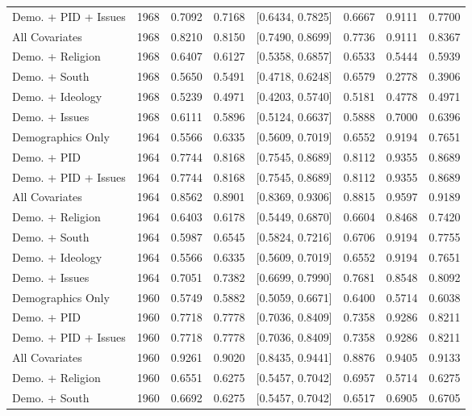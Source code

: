 \begin{longtable}{lrrrlrrr}
  Demo. + PID + Issues & 1968 & 0.7092 & 0.7168 & [0.6434, 0.7825] & 0.6667 & 0.9111 & 0.7700 \\ 
  All Covariates & 1968 & 0.8210 & 0.8150 & [0.7490, 0.8699] & 0.7736 & 0.9111 & 0.8367 \\ 
  Demo. + Religion & 1968 & 0.6407 & 0.6127 & [0.5358, 0.6857] & 0.6533 & 0.5444 & 0.5939 \\ 
  Demo. + South & 1968 & 0.5650 & 0.5491 & [0.4718, 0.6248] & 0.6579 & 0.2778 & 0.3906 \\ 
  Demo. + Ideology & 1968 & 0.5239 & 0.4971 & [0.4203, 0.5740] & 0.5181 & 0.4778 & 0.4971 \\ 
  Demo. + Issues & 1968 & 0.6111 & 0.5896 & [0.5124, 0.6637] & 0.5888 & 0.7000 & 0.6396 \\ 
  Demographics Only & 1964 & 0.5566 & 0.6335 & [0.5609, 0.7019] & 0.6552 & 0.9194 & 0.7651 \\ 
  Demo. + PID & 1964 & 0.7744 & 0.8168 & [0.7545, 0.8689] & 0.8112 & 0.9355 & 0.8689 \\ 
  Demo. + PID + Issues & 1964 & 0.7744 & 0.8168 & [0.7545, 0.8689] & 0.8112 & 0.9355 & 0.8689 \\ 
  All Covariates & 1964 & 0.8562 & 0.8901 & [0.8369, 0.9306] & 0.8815 & 0.9597 & 0.9189 \\ 
  Demo. + Religion & 1964 & 0.6403 & 0.6178 & [0.5449, 0.6870] & 0.6604 & 0.8468 & 0.7420 \\ 
  Demo. + South & 1964 & 0.5987 & 0.6545 & [0.5824, 0.7216] & 0.6706 & 0.9194 & 0.7755 \\ 
  Demo. + Ideology & 1964 & 0.5566 & 0.6335 & [0.5609, 0.7019] & 0.6552 & 0.9194 & 0.7651 \\ 
  Demo. + Issues & 1964 & 0.7051 & 0.7382 & [0.6699, 0.7990] & 0.7681 & 0.8548 & 0.8092 \\ 
  Demographics Only & 1960 & 0.5749 & 0.5882 & [0.5059, 0.6671] & 0.6400 & 0.5714 & 0.6038 \\ 
  Demo. + PID & 1960 & 0.7718 & 0.7778 & [0.7036, 0.8409] & 0.7358 & 0.9286 & 0.8211 \\ 
  Demo. + PID + Issues & 1960 & 0.7718 & 0.7778 & [0.7036, 0.8409] & 0.7358 & 0.9286 & 0.8211 \\ 
  All Covariates & 1960 & 0.9261 & 0.9020 & [0.8435, 0.9441] & 0.8876 & 0.9405 & 0.9133 \\ 
  Demo. + Religion & 1960 & 0.6551 & 0.6275 & [0.5457, 0.7042] & 0.6957 & 0.5714 & 0.6275 \\ 
  Demo. + South & 1960 & 0.6692 & 0.6275 & [0.5457, 0.7042] & 0.6517 & 0.6905 & 0.6705 \\ 

\end{longtable}
